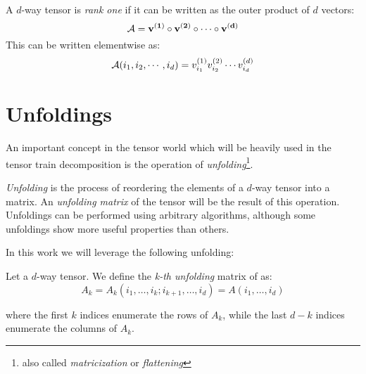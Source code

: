 
\begin{Def}
  A $d$-way tensor \A is \emph{rank one} if it can be written as the outer product of $d$ vectors:
  \[
  \mathcal{A} = \mathbf{v^{(1)}} \circ \mathbf{v^{(2)}} \circ \cdots \circ \mathbf{v^{(d)}}
  \]
  This can be written elementwise as:
  \[
  \mathcal{A}(i_1,i_2,\cdots,i_d) = v_{i_1}^{(1)} v_{i_2}^{(2)} \cdots v_{i_d}^{(d)}
  \]
\end{Def}

\section{Unfoldings}
An important concept in the tensor world which will be heavily used in the tensor train decomposition is the operation of \emph{unfolding}\footnote{also called \emph{matricization} or \emph{flattening}}.

\emph{Unfolding} is the process of reordering the elements of a $d$-way tensor into a matrix. An \emph{unfolding matrix} of the tensor will be the result of this operation. Unfoldings can be performed using arbitrary algorithms, although some unfoldings show more useful properties than others.

In this work we will leverage the following unfolding:

\begin{Def}
  Let \A a $d$-way tensor. We define the \emph{k-th unfolding} matrix of \A as:
  \begin{equation} \label{def:unfolding}
    A_k = A_k(i_1,\dots,i_k;i_{k+1},\dots,i_d) = A(i_1,\dots,i_d)
  \end{equation}

where the first $k$ indices enumerate the rows of $A_k$, while the last $d - k$ indices enumerate the columns of $A_k$.
\end{Def}

